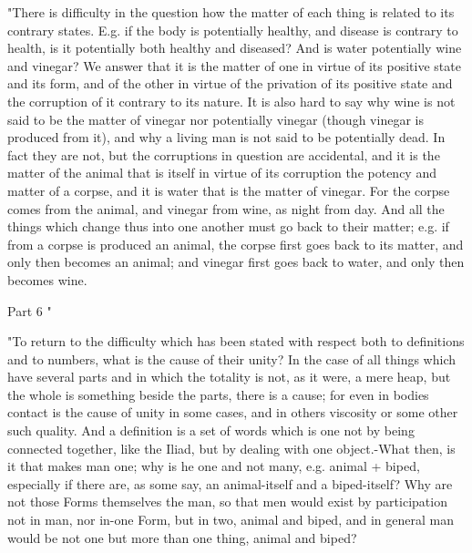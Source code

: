 "There is difficulty in the question how the matter of each thing
is related to its contrary states. E.g. if the body is potentially
healthy, and disease is contrary to health, is it potentially both
healthy and diseased? And is water potentially wine and vinegar? We
answer that it is the matter of one in virtue of its positive state
and its form, and of the other in virtue of the privation of its positive
state and the corruption of it contrary to its nature. It is also
hard to say why wine is not said to be the matter of vinegar nor potentially
vinegar (though vinegar is produced from it), and why a living man
is not said to be potentially dead. In fact they are not, but the
corruptions in question are accidental, and it is the matter of the
animal that is itself in virtue of its corruption the potency and
matter of a corpse, and it is water that is the matter of vinegar.
For the corpse comes from the animal, and vinegar from wine, as night
from day. And all the things which change thus into one another must
go back to their matter; e.g. if from a corpse is produced an animal,
the corpse first goes back to its matter, and only then becomes an
animal; and vinegar first goes back to water, and only then becomes
wine. 

Part 6 "

"To return to the difficulty which has been stated with respect both
to definitions and to numbers, what is the cause of their unity? In
the case of all things which have several parts and in which the totality
is not, as it were, a mere heap, but the whole is something beside
the parts, there is a cause; for even in bodies contact is the cause
of unity in some cases, and in others viscosity or some other such
quality. And a definition is a set of words which is one not by being
connected together, like the Iliad, but by dealing with one object.-What
then, is it that makes man one; why is he one and not many, e.g. animal
+ biped, especially if there are, as some say, an animal-itself and
a biped-itself? Why are not those Forms themselves the man, so that
men would exist by participation not in man, nor in-one Form, but
in two, animal and biped, and in general man would be not one but
more than one thing, animal and biped? 

